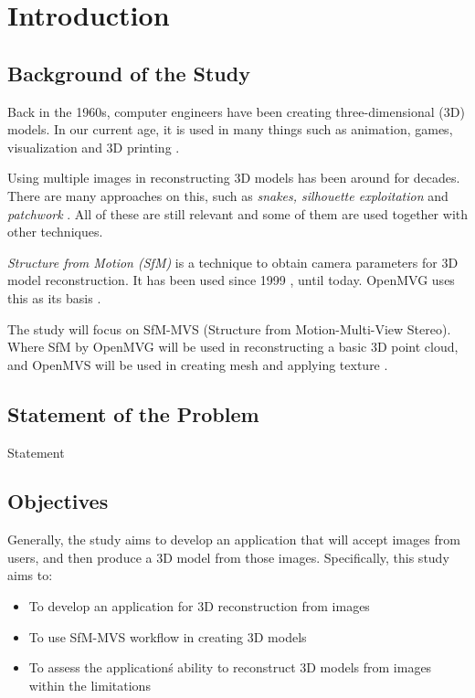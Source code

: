 \documentclass[journal]{./IEEE/IEEEtran}
\title{\SPTITLE}
\author{\ADVISEE~and~\ADVISER%
}
\begin{document}
\maketitle


\section{Introduction}

\subsection{Background of the Study}
Back in the 1960s, computer engineers have been creating three-dimensional (3D) models. In our current age, it is used in many things such as animation, games, visualization and 3D printing \cite{Archicgi}.

Using multiple images in reconstructing 3D models has been around for decades. There are many approaches on this, such as \textit{snakes, silhouette exploitation} and \textit{patchwork} \cite{Paris}. All of these are still relevant and some of them are used together with other techniques.

\textit{Structure from Motion (SfM)} is a technique to obtain camera parameters for 3D model reconstruction. It has been used since 1999 \cite{Jebaraa}, until today. OpenMVG uses this as its basis \cite{OpenMVG}.

The study will focus on SfM-MVS (Structure from Motion-Multi-View Stereo). Where SfM by OpenMVG will be used in reconstructing a basic 3D point cloud, and OpenMVS will be used in creating mesh and applying texture \cite{OpenMVS}.

\subsection{Statement of the Problem}
Statement

\subsection{Objectives}
Generally, the study aims to develop an application that will accept images from users, and then produce a 3D model from those images. Specifically, this study aims to:

\begin{itemize}
\item To develop an application for 3D reconstruction from images
\item To use SfM-MVS workflow in creating 3D models
\item To assess the application\'s ability to reconstruct 3D models from images within the limitations
\end{itemize}
\end{document}
